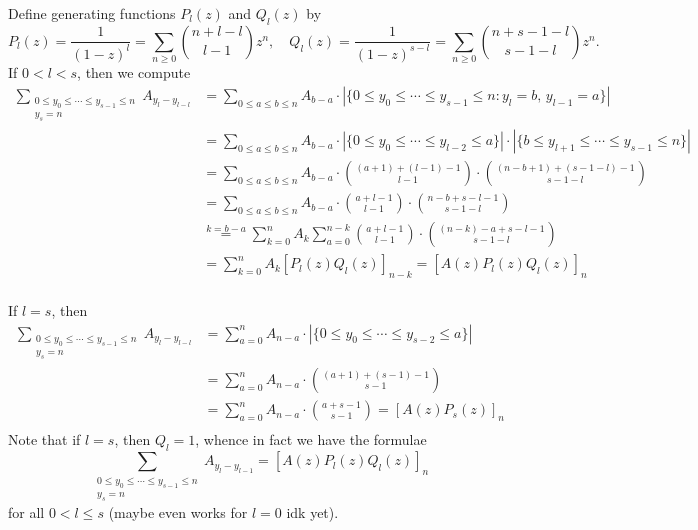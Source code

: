 \documentclass[12pt]{article}
\begin{document}
Define generating functions $ P_{l}(z) $ and $ Q_{l}(z) $ by 
\[
    P_{l}(z) = \frac{1}{(1-z)^{l}}= \sum_{n\geq 0} \binom{n+l-l}{l-1}z^{n}, \quad Q_{l}(z) = \frac{1}{(1-z)^{s-l}} = \sum_{n\geq 0} \binom{n+s-1-l}{s-1-l} z^{n}.
\]
If $0 <l<s $, then we compute
\begin{align*}
    \sum_{\substack{0\leq y_{0}\leq \cdots\leq y_{s-1}\leq n\\y_{s}=n}}A_{y_{l}-y_{l-l}} &= \sum_{0\leq a\leq b\leq n}A_{b-a} \cdot |\{0\leq y_{0}\leq \cdots \leq y_{s-1}\leq n : y_{l}=b,\, y_{l-1}=a\}|\\
    &= \sum_{0\leq a\leq b\leq n}A_{b-a} \cdot |\{0\leq y_{0}\leq \cdots \leq y_{l-2} \leq a\}|\cdot |\{ b\leq y_{l+1}\leq\cdots \leq  y_{s-1}\leq n\}|\\
    &= \sum_{0\leq a\leq b\leq n}A_{b-a} \cdot \binom{(a+1)+(l-1)-1}{l-1}\cdot \binom{(n-b+1)+(s-1-l) -1}{s-1-l}\\
    &= \sum_{0\leq a\leq b\leq n}A_{b-a} \cdot \binom{a+l-1}{l-1}\cdot \binom{n-b+s-l-1}{s-1-l}\\
    &\overset{k=b-a}{=} \sum_{k=0}^{n}A_{k}\sum_{a=0}^{n-k}\binom{a+l-1}{l-1}\cdot \binom{(n-k)-a+s-l-1}{s-1-l}\\
    &= \sum_{k=0}^{n}A_{k}[P_{l}(z)Q_{l}(z)]_{n-k} = [A(z) P_{l}(z) Q_{l}(z)]_{n}\\
\end{align*}

If $ l=s $, then
\begin{align*}
    \sum_{\substack{0\leq y_{0}\leq \cdots\leq y_{s-1}\leq n\\y_{s}=n}}A_{y_{l}-y_{l-l}} &= \sum_{a=0}^{n}A_{n-a} \cdot |\{0\leq y_{0}\leq \cdots \leq y_{s-2}\leq a\}|\\
    &= \sum_{a=0}^{n}A_{n-a} \cdot \binom{(a+1) + (s-1) -1}{s-1}\\
    &= \sum_{a=0}^{n}A_{n-a} \cdot \binom{a + s -1}{s-1} = [A(z)P_{s}(z)]_{n}\\
\end{align*}
Note that if $ l=s $, then $ Q_{l} = 1 $, whence in fact we have the formulae
\[
    \sum_{\substack{0\leq y_{0}\leq \cdots \leq y_{s-1}\leq n\\y_{s}=n}} A_{y_{l}-y_{l-1}} = [A(z)P_{l}(z) Q_{l}(z)]_{n}
\]
for all $ 0<l\leq s $ (maybe even works for $ l=0 $ idk yet).
\end{document}
